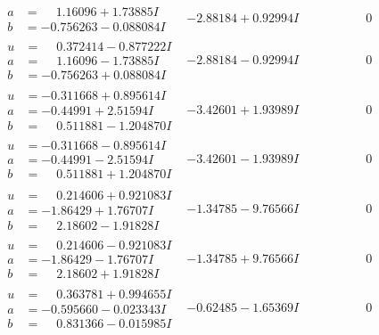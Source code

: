 \documentclass[1p]{elsarticle_modified}
\theoremstyle{definition}
\begin{document}
$$\begin{array}{c|c|c}
\begin{aligned}
a &= \phantom{-}1.16096 + 1.73885 I \\
b &= -0.756263 - 0.088084 I\end{aligned}
 & -2.88184 + 0.92994 I & \phantom{-0.000000 } 0 \\ \hline\begin{aligned}
u &= \phantom{-}0.372414 - 0.877222 I \\
a &= \phantom{-}1.16096 - 1.73885 I \\
b &= -0.756263 + 0.088084 I\end{aligned}
 & -2.88184 - 0.92994 I & \phantom{-0.000000 } 0 \\ \hline\begin{aligned}
u &= -0.311668 + 0.895614 I \\
a &= -0.44991 + 2.51594 I \\
b &= \phantom{-}0.511881 - 1.204870 I\end{aligned}
 & -3.42601 + 1.93989 I & \phantom{-0.000000 } 0 \\ \hline\begin{aligned}
u &= -0.311668 - 0.895614 I \\
a &= -0.44991 - 2.51594 I \\
b &= \phantom{-}0.511881 + 1.204870 I\end{aligned}
 & -3.42601 - 1.93989 I & \phantom{-0.000000 } 0 \\ \hline\begin{aligned}
u &= \phantom{-}0.214606 + 0.921083 I \\
a &= -1.86429 + 1.76707 I \\
b &= \phantom{-}2.18602 - 1.91828 I\end{aligned}
 & -1.34785 - 9.76566 I & \phantom{-0.000000 } 0 \\ \hline\begin{aligned}
u &= \phantom{-}0.214606 - 0.921083 I \\
a &= -1.86429 - 1.76707 I \\
b &= \phantom{-}2.18602 + 1.91828 I\end{aligned}
 & -1.34785 + 9.76566 I & \phantom{-0.000000 } 0 \\ \hline\begin{aligned}
u &= \phantom{-}0.363781 + 0.994655 I \\
a &= -0.595660 - 0.023343 I \\
b &= \phantom{-}0.831366 - 0.015985 I\end{aligned}
 & -0.62485 - 1.65369 I & \phantom{-0.000000 } 0 \\ \hline\begin{aligned}

\end{aligned}
\end{array}$$
\end{document}
